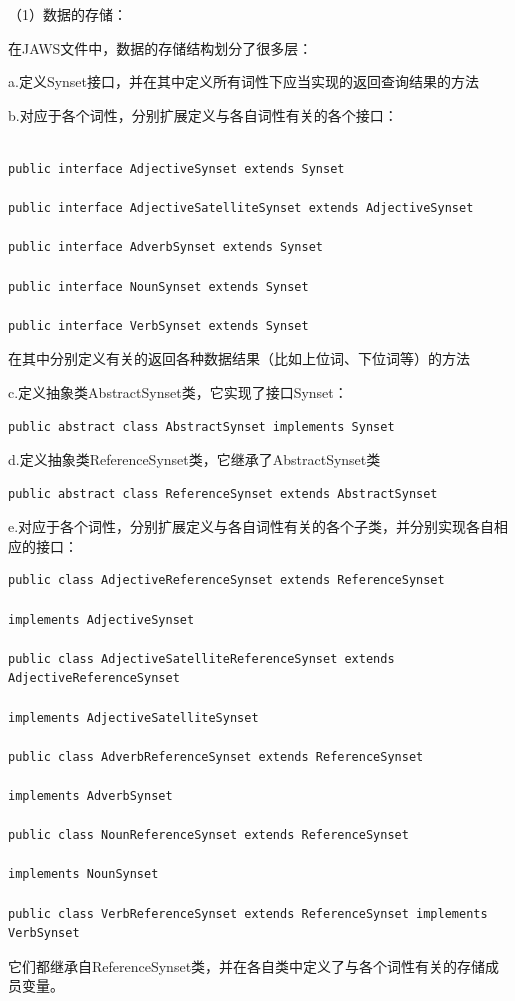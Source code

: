 \documentclass[a4paper,unicode=true,xetex]{article}
\begin{document}
（1）数据的存储：

在JAWS文件中，数据的存储结构划分了很多层：

a.定义Synset接口，并在其中定义所有词性下应当实现的返回查询结果的方法

b.对应于各个词性，分别扩展定义与各自词性有关的各个接口：
\begin{lstlisting}

public interface AdjectiveSynset extends Synset

public interface AdjectiveSatelliteSynset extends AdjectiveSynset

public interface AdverbSynset extends Synset

public interface NounSynset extends Synset

public interface VerbSynset extends Synset

\end{lstlisting}
在其中分别定义有关的返回各种数据结果（比如上位词、下位词等）的方法

c.定义抽象类AbstractSynset类，它实现了接口Synset：
\begin{lstlisting}
public abstract class AbstractSynset implements Synset
\end{lstlisting}
d.定义抽象类ReferenceSynset类，它继承了AbstractSynset类

\begin{lstlisting}
public abstract class ReferenceSynset extends AbstractSynset
\end{lstlisting}

e.对应于各个词性，分别扩展定义与各自词性有关的各个子类，并分别实现各自相应的接口：
\begin{lstlisting}
public class AdjectiveReferenceSynset extends ReferenceSynset

implements AdjectiveSynset

public class AdjectiveSatelliteReferenceSynset extends AdjectiveReferenceSynset

implements AdjectiveSatelliteSynset

public class AdverbReferenceSynset extends ReferenceSynset

implements AdverbSynset

public class NounReferenceSynset extends ReferenceSynset

implements NounSynset

public class VerbReferenceSynset extends ReferenceSynset implements VerbSynset
\end{lstlisting}
它们都继承自ReferenceSynset类，并在各自类中定义了与各个词性有关的存储成员变量。
\end{document}

